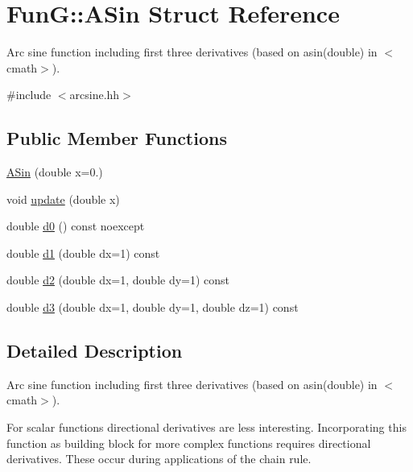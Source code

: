 \hypertarget{structFunG_1_1ASin}{\section{\-Fun\-G\-:\-:\-A\-Sin \-Struct \-Reference}
\label{structFunG_1_1ASin}
}


\-Arc sine function including first three derivatives (based on asin(double) in $<$cmath$>$).  




{\ttfamily \#include $<$arcsine.\-hh$>$}

\subsection*{\-Public \-Member \-Functions}
\begin{DoxyCompactItemize}
\item 
\hyperlink{structFunG_1_1ASin_aea477c9658dc3cea15cd77aa637b5ce4}{\-A\-Sin} (double x=0.)
\item 
void \hyperlink{structFunG_1_1ASin_a0c7e3aa8b532914de2068b3bc74d57f1}{update} (double x)
\item 
double \hyperlink{structFunG_1_1ASin_a9c3b2d30afbd9d258b7bf30b425f5600}{d0} () const noexcept
\item 
double \hyperlink{structFunG_1_1ASin_a0468608cbecdcc4d8d5eca641232ceba}{d1} (double dx=1) const 
\item 
double \hyperlink{structFunG_1_1ASin_a3bf0627e743505d38f04e9d9132331df}{d2} (double dx=1, double dy=1) const 
\item 
double \hyperlink{structFunG_1_1ASin_a50f2fbd6e12b64492ef63c732f0f82f1}{d3} (double dx=1, double dy=1, double dz=1) const 
\end{DoxyCompactItemize}


\subsection{\-Detailed \-Description}
\-Arc sine function including first three derivatives (based on asin(double) in $<$cmath$>$). 

\-For scalar functions directional derivatives are less interesting. \-Incorporating this function as building block for more complex functions requires directional derivatives. \-These occur during applications of the chain rule. 

